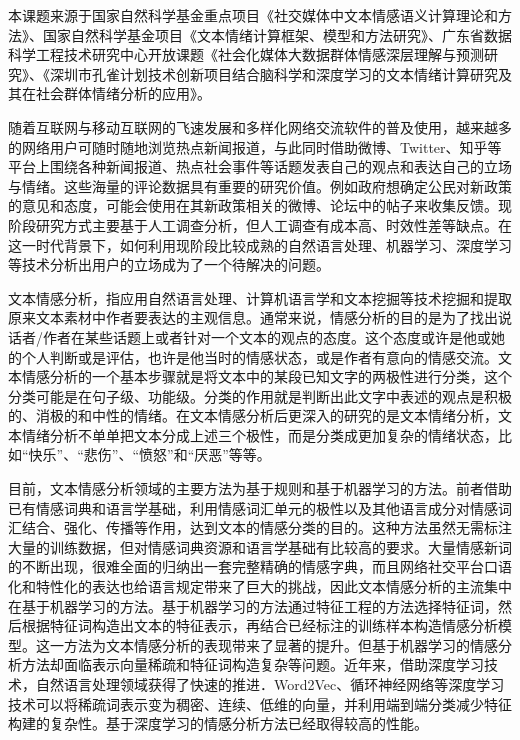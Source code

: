 


本课题来源于国家自然科学基金重点项目《社交媒体中文本情感语义计算理论和方法》、国家自然科学基金项目《文本情绪计算框架、模型和方法研究》、广东省数据科学工程技术研究中心开放课题《社会化媒体大数据群体情感深层理解与预测研究》、《深圳市孔雀计划技术创新项目结合脑科学和深度学习的文本情绪计算研究及其在社会群体情绪分析的应用》。



随着互联网与移动互联网的飞速发展和多样化网络交流软件的普及使用，越来越多的网络用户可随时随地浏览热点新闻报道，与此同时借助微博、Twitter、知乎等平台上围绕各种新闻报道、热点社会事件等话题发表自己的观点和表达自己的立场与情绪。这些海量的评论数据具有重要的研究价值。例如政府想确定公民对新政策的意见和态度，可能会使用在其新政策相关的微博、论坛中的帖子来收集反馈。现阶段研究方式主要基于人工调查分析，但人工调查有成本高、时效性差等缺点。在这一时代背景下，如何利用现阶段比较成熟的自然语言处理、机器学习、深度学习等技术分析出用户的立场成为了一个待解决的问题。

文本情感分析，指应用自然语言处理、计算机语言学和文本挖掘等技术挖掘和提取原来文本素材中作者要表达的主观信息。通常来说，情感分析的目的是为了找出说话者/作者在某些话题上或者针对一个文本的观点的态度。这个态度或许是他或她的个人判断或是评估，也许是他当时的情感状态，或是作者有意向的情感交流。文本情感分析的一个基本步骤就是将文本中的某段已知文字的两极性进行分类，这个分类可能是在句子级、功能级。分类的作用就是判断出此文字中表述的观点是积极的、消极的和中性的情绪。在文本情感分析后更深入的研究的是文本情绪分析，文本情绪分析不单单把文本分成上述三个极性，而是分类成更加复杂的情绪状态，比如“快乐”、“悲伤”、“愤怒”和“厌恶”等等。

目前，文本情感分析领域的主要方法为基于规则和基于机器学习的方法。前者借助已有情感词典和语言学基础，利用情感词汇单元的极性以及其他语言成分对情感词汇结合、强化、传播等作用，达到文本的情感分类的目的。这种方法虽然无需标注大量的训练数据，但对情感词典资源和语言学基础有比较高的要求。大量情感新词的不断出现，很难全面的归纳出一套完整精确的情感字典，而且网络社交平台口语化和特性化的表达也给语言规定带来了巨大的挑战，因此文本情感分析的主流集中在基于机器学习的方法。基于机器学习的方法通过特征工程的方法选择特征词，然后根据特征词构造出文本的特征表示，再结合已经标注的训练样本构造情感分析模型。这一方法为文本情感分析的表现带来了显著的提升。但基于机器学习的情感分析方法却面临表示向量稀疏和特征词构造复杂等问题。近年来，借助深度学习技术，自然语言处理领域获得了快速的推进．Word2Vec、循环神经网络等深度学习技术可以将稀疏词表示变为稠密、连续、低维的向量，并利用端到端分类减少特征构建的复杂性。基于深度学习的情感分析方法已经取得较高的性能。

